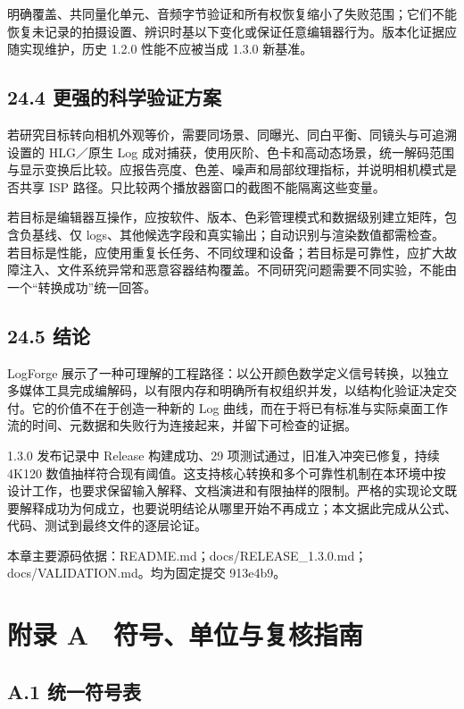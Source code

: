 \documentclass[UTF8,zihao=-4,openany]{ctexbook}
\begin{document}
明确覆盖、共同量化单元、音频字节验证和所有权恢复缩小了失败范围；它们不能恢复未记录的拍摄设置、辨识时基以下变化或保证任意编辑器行为。版本化证据应随实现维护，历史 1.2.0 性能不应被当成 1.3.0 新基准。


\section*{24.4 更强的科学验证方案}
若研究目标转向相机外观等价，需要同场景、同曝光、同白平衡、同镜头与可追溯设置的 HLG／原生 Log 成对捕获，使用灰阶、色卡和高动态场景，统一解码范围与显示变换后比较。应报告亮度、色差、噪声和局部纹理指标，并说明相机模式是否共享 ISP 路径。只比较两个播放器窗口的截图不能隔离这些变量。

若目标是编辑器互操作，应按软件、版本、色彩管理模式和数据级别建立矩阵，包含负基线、仅 logs、其他候选字段和真实输出；自动识别与渲染数值都需检查。若目标是性能，应使用重复长任务、不同纹理和设备；若目标是可靠性，应扩大故障注入、文件系统异常和恶意容器结构覆盖。不同研究问题需要不同实验，不能由一个“转换成功”统一回答。


\section*{24.5 结论}
LogForge 展示了一种可理解的工程路径：以公开颜色数学定义信号转换，以独立多媒体工具完成编解码，以有限内存和明确所有权组织并发，以结构化验证决定交付。它的价值不在于创造一种新的 Log 曲线，而在于将已有标准与实际桌面工作流的时间、元数据和失败行为连接起来，并留下可检查的证据。

1.3.0 发布记录中 Release 构建成功、29 项测试通过，旧准入冲突已修复，持续 4K120 数值抽样符合现有阈值。这支持核心转换和多个可靠性机制在本环境中按设计工作，也要求保留输入解释、文档演进和有限抽样的限制。严格的实现论文既要解释成功为何成立，也要说明结论从哪里开始不再成立；本文据此完成从公式、代码、测试到最终文件的逐层论证。


\par\small 本章主要源码依据：README.md；docs/RELEASE\_1.3.0.md；docs/VALIDATION.md。均为固定提交 913e4b9。\normalsize

\chapter*{附录 A　符号、单位与复核指南}

\section*{A.1 统一符号表}
\end{document}
